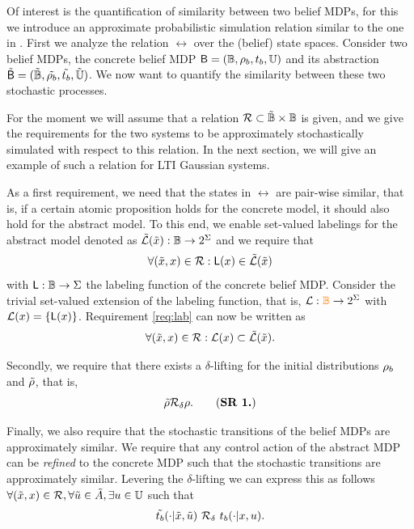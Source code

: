 \documentclass{ifacconf}
\newcommand{\cristi}[1]{{\color{orange}#1}}
\begin{document}
 Of interest is the quantification of similarity between two belief MDPs, for this we introduce an approximate probabilistic simulation relation similar to the one in \citep{haesaert2017verification}.
   First we analyze the relation $\rel$ over the (belief) state spaces.
\color{blue} Consider two belief MDPs, the concrete belief MDP $\mathsf{B}= (\mathbb{B}, \rho_b, t_b, {\mathbb{U}})$  and its abstraction $\tilde {\mathsf{B}}=(\tilde{\mathbb{B}}, \tilde{\rho_b}, \tilde{t_b}, \tilde{{\mathbb{U}}})$. 
We now want to quantify the similarity between these two stochastic processes.

  For the moment we will assume that a relation $\mathcal{R}\subset \tilde {\mathbb{B}} \times \mathbb{B}$ is given, and we give the requirements for the two systems to be approximately stochastically simulated with respect to this relation. In the next section, we will give an example of such a relation for LTI Gaussian systems. 

As a first requirement, we need that the states in $\rel$ are pair-wise similar, that is, if a certain atomic proposition holds for the concrete model, it should also hold for the abstract model. To this end, we enable set-valued labelings for the abstract model denoted as  $ \tilde{\mathcal{L}}(\tilde x):\mathbb{B}\rightarrow2^\Sigma$ and we require that  \begin{equation}\label{req:lab}
  \forall (\tilde x,x )\in \mathcal{R}:  \mathsf{L}(x)\in \tilde{\mathcal{L}}(\tilde x)
  \end{equation} with $\mathsf{L}:\mathbb{B}\rightarrow\Sigma$ the labeling function of the concrete belief MDP.
Consider 
 the trivial set-valued extension of  the labeling function, that is,  $\Labset:\cristi{\Xb}\rightarrow2^\alphabeth$ with
 $\mathcal{L}(x)=\{\mathsf{L}(x)\}$.
Requirement \eqref{req:lab} can now be written as  \begin{equation}
  \forall (\tilde x,x )\in \mathcal{R}:  \mathcal{L}(x)\subset \tilde{\mathcal{L}}(\tilde x).
  \end{equation} 
  
Secondly, we require that there exists a $\delta$-lifting for the initial distributions $\rho_b$ and $\tilde{\rho}$, that is,
\begin{equation}
\tilde\init \bar \rel_\delta \init.
	\tag{\textbf{SR 1.}}
\end{equation}

Finally, we also require that the stochastic transitions of the belief MDPs are approximately similar.  We require that any control action of the abstract MDP can be \emph{refined} to the concrete MDP such that the stochastic transitions are approximately similar. Levering the $\delta$-lifting  we can  express this as follows $\forall (\tilde x, x)\in \mathcal{R}, \forall \tilde u \in \tilde A, \exists u \in {\mathbb{U}}$ such that 
\begin{equation}\label{req:translifting}
	\tilde {t_b}(\cdot| \tilde x, \tilde u)\ \relax \mathcal{R}_\delta \  t_b(\cdot| x, u).
\end{equation}
\end{document}
